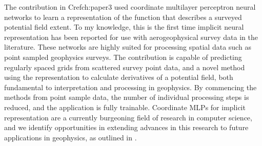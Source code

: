 The contribution in Cref{ch:paper3} used coordinate multilayer perceptron neural networks to learn a representation of the function that describes a surveyed potential field extent.
To my knowledge, this is the first time implicit neural representation has been reported for use with aerogeophysical survey data in the literature.
These networks are highly suited for processing spatial data such as point sampled geophysics surveys.
The contribution is capable of predicting regularly spaced grids from scattered survey point data, and a novel method using the representation to calculate derivatives of a potential field, both fundamental to interpretation and processing in geophysics.
By commencing the methods from point sample data, the number of individual processing steps is reduced, and the application is fully trainable.
Coordinate MLPs for implicit representation are a currently burgeoning field of research in computer science, and we identify opportunities in extending advances in this research to future applications in geophysics, as outlined in .


% 